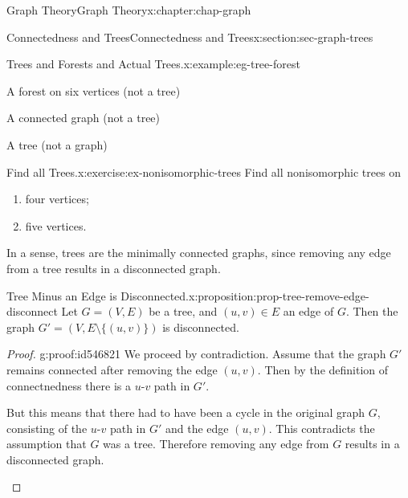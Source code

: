 \documentclass[oneside,10pt,]{book}
\numberwithin{equation}{section}
\begin{document}
\begin{chapterptx}{Graph Theory}{}{Graph Theory}{}{}{x:chapter:chap-graph}
\begin{sectionptx}{Connectedness and Trees}{}{Connectedness and Trees}{}{}{x:section:sec-graph-trees}
\begin{example}{Trees and Forests and Actual Trees.}{x:example:eg-tree-forest}
\begin{sidebyside}{4}{0.0275}{0.0275}{0.055}
\begin{sbspanel}{0.2}
A forest on six vertices (not a tree)%
\end{sbspanel}%
\begin{sbspanel}{0.2}%
\par
A connected graph (not a tree)%
\end{sbspanel}%
\begin{sbspanel}{0.18}%
\par
A tree (not a graph)%
\end{sbspanel}%
\end{sidebyside}%
\end{example}
\begin{inlineexercise}{Find all Trees.}{x:exercise:ex-nonisomorphic-trees}%
Find all nonisomorphic trees on%
\begin{enumerate}[label=(\alph*)]
\item{}four vertices;%
\item{}five vertices.%
\end{enumerate}
%
\end{inlineexercise}%
In a sense, trees are the minimally connected graphs, since removing any edge from a tree results in a disconnected graph.%
\begin{proposition}{Tree Minus an Edge is Disconnected.}{}{x:proposition:prop-tree-remove-edge-disconnect}%
Let \(G = (V,E)\) be a tree, and \((u,v) \in E\) an edge of \(G\). Then the graph \(G' = \left(V, E \setminus \{(u,v)\}\right)\) is disconnected.%
\end{proposition}
\begin{proof}{}{g:proof:id546821}
We proceed by contradiction. Assume that the graph \(G'\) remains connected after removing the edge \((u,v)\). Then by the definition of connectnedness there is a \(u\)-\(v\) path in \(G'\).%
\begin{sidebyside}{2}{0}{0}{0.07}%
\begin{sbspanel}{0.75}%
But this means that there had to have been a cycle in the original graph \(G\), consisting of the \(u\)-\(v\) path in \(G'\) and the edge \((u,v)\). This contradicts the assumption that \(G\) was a tree. Therefore removing any edge from \(G\) results in a disconnected graph.%
\end{sbspanel}%
\begin{sbspanel}{0.18}%
\end{sbspanel}
\end{sidebyside}
\end{proof}
\end{sectionptx}
\end{chapterptx}
\end{document}
